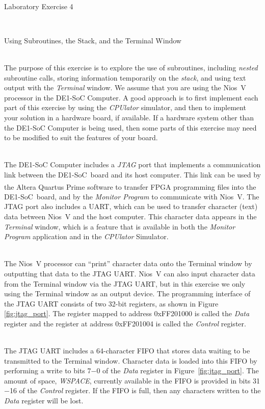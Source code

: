 \documentclass[epsfig,10pt,fullpage]{article}
\begin{document}
~\\
\centerline{\huge Laboratory Exercise 4}
~\\
\centerline{\large Using Subroutines, the Stack, and the Terminal Window}
~\\

\noindent
The purpose of this exercise is to explore the use of subroutines, including {\it nested}
subroutine calls, storing information temporarily on the {\it stack}, and using text output with
the {\it Terminal} window.  We assume that you are using the Nios~V processor in
the DE1-SoC Computer. A good approach is to first implement each part of this exercise by 
using the {\it CPUlator} simulator, and then to implement your solution in a hardware board,
if available. If a hardware system other than the DE1-SoC Computer is being used, then 
some parts of this exercise may need to be modified to suit the features of your board. 

~\\
\noindent
The DE1-SoC Computer includes a {\it JTAG} port that implements a communication link between the 
DE1-SoC~board and its host computer. This link can be used by the Altera 
Quartus\textsuperscript{\textregistered} Prime software to transfer FPGA programming files 
into the DE1-SoC~board, and by the {\it Monitor Program} to communicate with Nios~V.  
The JTAG port also includes a UART, which can be used to transfer character (text) data 
between Nios~V and the host computer. This character data appears in the {\it Terminal} window,
which is a feature that is available in both the {\it Monitor Program} application and in the 
{\it CPUlator} Simulator.

~\\
The Nios~V processor can ``print'' character data onto the Terminal window by outputting that
data to the JTAG UART. Nios~V can also input character data from the Terminal window via
the JTAG UART, but in this exercise we only using the Terminal window as an output device. 
The programming interface of the JTAG UART consists of two 32-bit registers, as shown in 
Figure \ref{fig:jtag_port}. The register mapped to address {\sf 0xFF201000} is called the 
{\it Data} register and the register at address {\sf 0xFF201004} is called the {\it Control}
register.

~\\
The JTAG UART includes a 64-character FIFO that stores data waiting to be transmitted to the 
Terminal window. Character data is loaded into this FIFO by performing a write to bits 7$-$0
of the {\it Data} register in Figure~\ref{fig:jtag_port}. The amount of space, {\it WSPACE},
currently available in the FIFO is provided in bits 31$-$16 of the {\it Control} register. If
the FIFO is full, then any characters written to the {\it Data} register will be lost.
\end{document}

